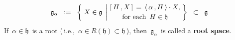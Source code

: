 \begin{definition}
\begin{enumerate}
\begin{equation*}
    \mathfrak{g}_{\alpha}
    \;\; := \;\;
        \left\{\;
            X \in \mathfrak{g}
            \;\left\vert\!
            \begin{array}{c}
                [\,H\,,X\,] \,=\, \langle\,\alpha\,,H\,\rangle \cdot X,
                \\
                \overset{{\color{white}.}}{\textnormal{for each \,$H \in \mathfrak{h}$}}
            \end{array}
            \right.
            \!\!\right\}
    \;\; \subset \;\;
        \mathfrak{g}
    \end{equation*}
    If \,$\alpha \in \mathfrak{h}$\, is a root
    (\,i.e., \,$\alpha \in R(\mathfrak{h}) \subset \mathfrak{h}$\,),
    then \,$\mathfrak{g}_{\alpha}$\, is called a \textbf{\color{red}root space}.
\end{enumerate}
\end{definition}


